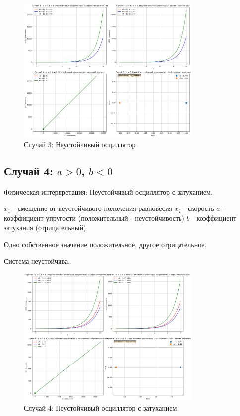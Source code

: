 \begin{figure}[h!]
\centering
\includegraphics[width=0.8\textwidth]{images/task3/случай_3_-_a_>_0_b_=_0_неустойчивый_осциллятор.png}
\caption{Случай 3: Неустойчивый осциллятор}
\label{fig:oscillator3}
\end{figure}

\subsection{Случай 4: $a > 0$, $b < 0$}

Физическая интерпретация: Неустойчивый осциллятор с затуханием.

$x_1$ - смещение от неустойчивого положения равновесия
$x_2$ - скорость
$a$ - коэффициент упругости (положительный - неустойчивость)
$b$ - коэффициент затухания (отрицательный)

Одно собственное значение положительное, другое отрицательное.

Система неустойчива.

\begin{figure}[h!]
\centering
\includegraphics[width=0.8\textwidth]{images/task3/случай_4_-_a_>_0_b_<_0_неустойчивый_осциллятор_с_затуханием.png}
\caption{Случай 4: Неустойчивый осциллятор с затуханием}
\label{fig:oscillator4}
\end{figure}

